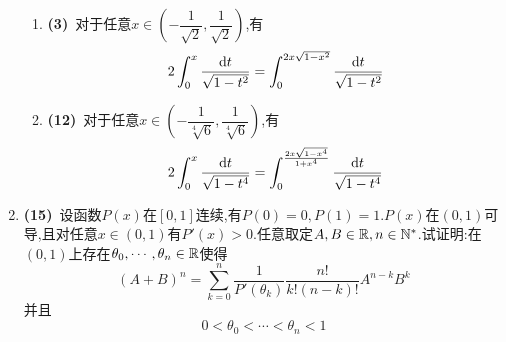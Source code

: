 \documentclass{ctexart}
\begin{document}
\begin{enumerate}[leftmargin=*,label=\textbf{\arabic*.}]
\begin{enumerate}[label=\tbf{(\arabic*)}]
            \item \textbf{(3)}\ 对于任意$x\in\left(-\dfrac{1}{\sqrt2},\dfrac{1}{\sqrt2}\right)$,有\[2\int_0^x\dfrac{\mathrm{d} t}{\sqrt{1-t^2}}=\int_0^{2x\sqrt{1-x^2}}\dfrac{\mathrm{d} t}{\sqrt{1-t^2}}\]
            \item \textbf{(12)}\ 对于任意$x\in\left(-\dfrac{1}{\sqrt[4]{6}},\dfrac{1}{\sqrt[4]{6}}\right)$,有\[2\int_0^x\dfrac{\mathrm{d} t}{\sqrt{1-t^4}}=\int_{0}^{\frac{2x\sqrt{1-x^4}}{1+x^4}}\dfrac{\mathrm{d} t}{\sqrt{1-t^4}}\]
        \end{enumerate}
    \item \textbf{(15)}\ 设函数$P(x)$在$[0,1]$连续,有$P(0)=0,P(1)=1$.$P(x)$在$(0,1)$可导,且对任意$x\in(0,1)$有$P'(x)>0$.任意取定$A,B\in\mathbb{R},n\in\mathbb{N}^*$.试证明:在$(0,1)$上存在$\theta_0,\cdots,\theta_n\in\mathbb{R}$使得
        \[(A+B)^n=\sum_{k=0}^n\dfrac{1}{P'(\theta_k)}\dfrac{n!}{k!(n-k)!}A^{n-k}B^k\]
        并且\[0<\theta_0<\cdots<\theta_n<1\]
\end{enumerate}
\end{document}

